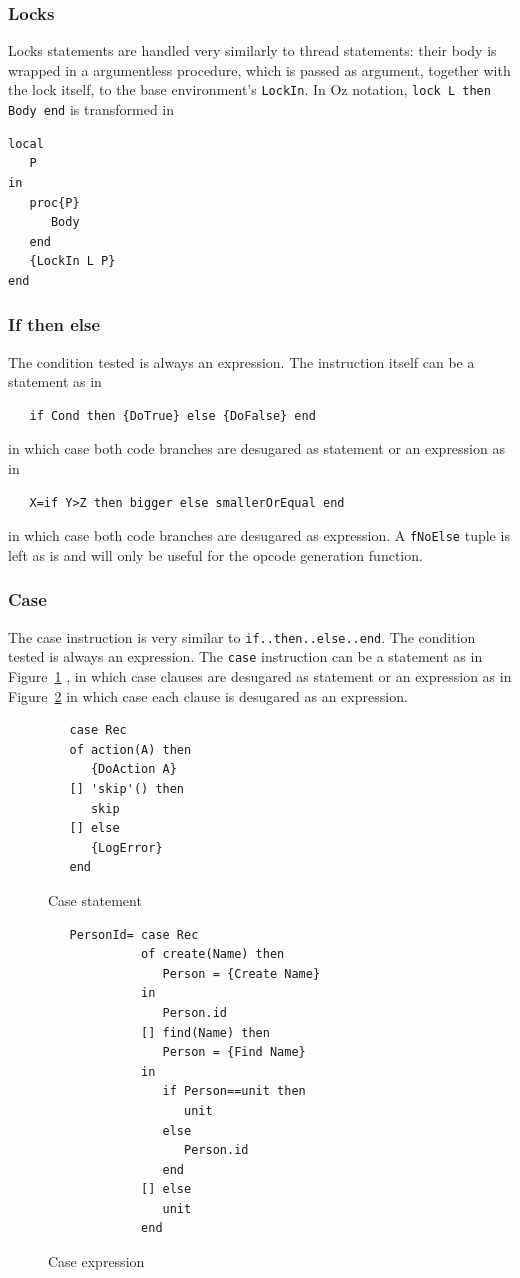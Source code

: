 \documentclass[a4paper]{memoir}
\begin{document}
\subsubsection{Locks}
Locks statements are handled very similarly to thread statements: their body is
wrapped in a argumentless procedure, which is passed as argument, together with
the lock itself, to the base environment's \lstinline!LockIn!. In Oz notation, \lstinline!lock L then Body end! is transformed in
\begin{lstlisting}
local
   P
in
   proc{P}
      Body
   end
   {LockIn L P}
end
\end{lstlisting}


\subsubsection{If then else}
The condition tested is always an expression.
The instruction itself can be a statement as in 
\begin{lstlisting}
   if Cond then {DoTrue} else {DoFalse} end
\end{lstlisting}
in which case both code branches are desugared as statement
or an expression as in
\begin{lstlisting}
   X=if Y>Z then bigger else smallerOrEqual end
\end{lstlisting}
in which case both code branches are desugared as expression.
A \lstinline!fNoElse! tuple is left as is and will only be useful for the opcode generation function.

\subsubsection{Case}
The case instruction is very similar to \lstinline!if..then..else..end!.
The condition tested is always an expression.
The \lstinline!case! instruction can be a statement as in Figure~\ref{fig:casestat}
, in which case clauses are desugared as statement or an expression as in Figure~\ref{fig:caseexpr}
in which case each clause is desugared as an expression.
\begin{figure}[h]
\begin{lstlisting}
   case Rec
   of action(A) then
      {DoAction A}
   [] 'skip'() then
      skip
   [] else
      {LogError}
   end
\end{lstlisting}
\caption{Case statement}
\label{fig:casestat}
\end{figure}

\begin{figure}[h]
\begin{lstlisting}
   PersonId= case Rec
             of create(Name) then
                Person = {Create Name}
             in
                Person.id
             [] find(Name) then
                Person = {Find Name}
             in
                if Person==unit then
                   unit
                else
                   Person.id
                end
             [] else
                unit
             end
\end{lstlisting}
\caption{Case expression}
\label{fig:caseexpr}
\end{figure}
\end{document}
